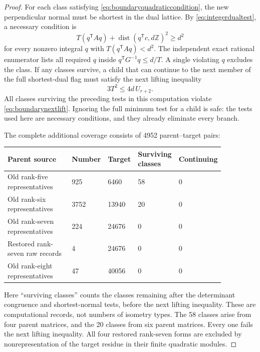 \documentclass[11pt,a4paper]{article}
\theoremstyle{remark}\newtheorem{remark}[theorem]{Remark}
\newcommand{\Z}{\mathbb Z}\newcommand{\R}{\mathbb R}\newcommand{\F}{\mathbb F}
\begin{document}
\begin{proof}
For each class satisfying \eqref{eq:boundaryquadraticcondition}, the new perpendicular normal must be shortest in the dual lattice. By \eqref{eq:integerdualtest}, a necessary condition is
\begin{equation}\label{eq:boundarydualcondition}
T(q^{\mathsf T}Aq)+\operatorname{dist}(q^{\mathsf T}c,d\Z)^2\ge d^2
\end{equation}
for every nonzero integral $q$ with $T(q^{\mathsf T}Aq)<d^2$. The independent exact rational enumerator lists all required $q$ inside $q^{\mathsf T}G^{-1}q\le d/T$. A single violating $q$ excludes the class. If any classes survive, a child that can continue to the next member of the full shortest-dual flag must satisfy the next lifting inequality
\begin{equation}\label{eq:boundarynextlift}
3T^2\le4d\,U_{r+2}.
\end{equation}
All classes surviving the preceding tests in this computation violate \eqref{eq:boundarynextlift}. Ignoring the full minimum test for a child is safe: the tests used here are necessary conditions, and they already eliminate every branch.

The complete additional coverage consists of 4952 parent--target pairs:
\begin{center}
\begin{tabular}{P{0.33\linewidth}P{0.10\linewidth}P{0.11\linewidth}P{0.18\linewidth}P{0.14\linewidth}}
\toprule
Parent source & Number & Target & Surviving classes & Continuing\\\midrule
Old rank-five representatives &925&6460&58&0\\
Old rank-six representatives &3752&13940&20&0\\
Old rank-seven representatives &224&24676&0&0\\
Restored rank-seven raw records &4&24676&0&0\\
Old rank-eight representatives &47&40056&0&0\\
\bottomrule
\end{tabular}
\end{center}
Here ``surviving classes'' counts the classes remaining after the determinant congruence and shortest-normal tests, before the next lifting inequality. These are computational records, not numbers of isometry types. The 58 classes arise from four parent matrices, and the 20 classes from six parent matrices. Every one fails the next lifting inequality. All four restored rank-seven forms are excluded by nonrepresentation of the target residue in their finite quadratic modules.


\end{proof}
\end{document}

